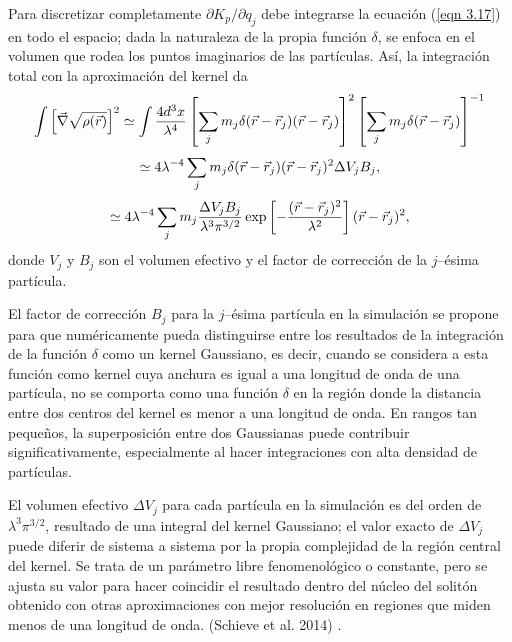 \documentclass[a4paper,openright,12pt]{book}
\begin{document}
Para discretizar completamente $\partial K_{p}/\partial q_{j}$ debe integrarse la ecuación (\ref{eqn 3.17}) en todo el espacio; dada la naturaleza de la propia función $\delta$, se enfoca en el volumen que rodea los puntos imaginarios de las partículas. Así, la integración total con la aproximación del kernel da
\begin{equation}
\int\left[\vec{\nabla}\sqrt{\rho (\vec{r})}\right]^{2}  \simeq 
\int \footnotesize{\frac{4 d^{3}x}{\lambda^{4}}
\left[
\sum_{j} m_{j}\delta(\vec{r}-\vec{r}_{j})(\vec{r}-\vec{r}_{j})
\right]^{2}
\left[
\sum_{j}m_{j}\delta(\vec{r}-\vec{r}_{j})
\right]^{-1}}\label{eqn 3.18}
\end{equation} 
\begin{equation}
\simeq
\footnotesize{4\lambda ^{-4} 
\sum_{j}m_{j}\delta(\vec{r}-\vec{r}_{j})(\vec{r}-\vec{r}_{j})^{2}\Delta V_{j}B_{j},}\label{eqn 3.19}
\end{equation}
\begin{equation}
\simeq
\footnotesize{4\lambda^{-4}
\sum_{j}m_{j}
\frac{\Delta V_{j}B_{j}}{\lambda^{3}\pi^{3/2}}
\exp\left[-\frac{(\vec{r}-\vec{r}_{j})^{2}}{\lambda^{2}}\right]
(\vec{r}-\vec{r}_{j})^{2},} \label{eqn 3.20}
\end{equation}
donde $V_{j}$ y $B_{j}$ son el volumen efectivo y el factor de corrección de la $j$--ésima partícula. 

El factor de corrección $B_{j}$ para la $j$--ésima partícula en la simulación se propone para que numéricamente pueda distinguirse entre los resultados de la integración de la función $\delta$ como un kernel Gaussiano, es decir,  cuando se considera a esta función como kernel cuya anchura es igual a una longitud de onda de una partícula, no se comporta como una función $\delta$ en la  región donde la distancia entre dos centros del kernel es menor a una longitud de onda. En rangos tan pequeños, la superposición entre dos Gaussianas puede contribuir significativamente, especialmente al hacer integraciones con alta densidad de partículas.

El volumen efectivo $\Delta V_{j}$ para cada partícula en la simulación es del orden de $\lambda^{3}\pi^{3/2}$, resultado de una integral del kernel Gaussiano; el valor exacto de $\Delta V_{j}$ puede diferir de  sistema a sistema por la propia complejidad de la región central del kernel. Se trata de un parámetro libre fenomenológico o constante, pero se ajusta su valor para hacer coincidir el resultado dentro del núcleo del solitón obtenido con otras aproximaciones con mejor resolución en regiones que miden menos de una longitud de onda. (Schieve et al. 2014) \cite{3.5}.
\end{document}
